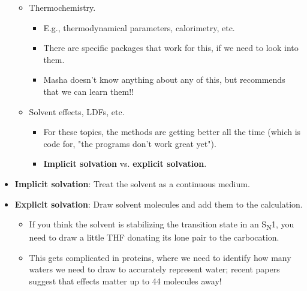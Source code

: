 \documentclass[../notes.tex]{subfiles}
\begin{document}
\begin{itemize}
\begin{itemize}
\begin{itemize}
        \end{itemize}
        \item Thermochemistry.
        \begin{itemize}
            \item E.g., thermodynamical parameters, calorimetry, etc.
            \item There are specific packages that work for this, if we need to look into them.
            \item Masha doesn't know anything about any of this, but recommends that we can learn them!!
        \end{itemize}
        \item Solvent effects, LDFs, etc.
        \begin{itemize}
            \item For these topics, the methods are getting better all the time (which is code for, "the programs don't work great yet").
            \item \textbf{Implicit solvation} vs. \textbf{explicit solvation}.
        \end{itemize}
    \end{itemize}
    \item \textbf{Implicit solvation}: Treat the solvent as a continuous medium.
    \item \textbf{Explicit solvation}: Draw solvent molecules and add them to the calculation.
    \begin{itemize}
        \item If you think the solvent is stabilizing the transition state in an S\textsubscript{N}1, you need to draw a little THF donating its lone pair to the carbocation.
        \item This gets complicated in proteins, where we need to identify how many waters we need to draw to accurately represent water; recent papers suggest that effects matter up to 44  molecules away!
    \end{itemize}
\end{itemize}
\end{document}
